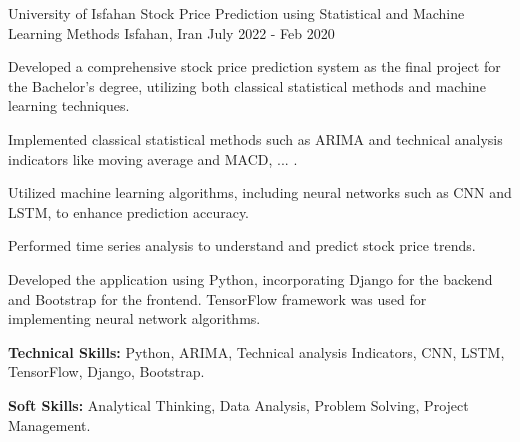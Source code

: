 

\begin{cventries}
	
	\cventry
	{University of Isfahan} %
	{Stock Price Prediction using Statistical and Machine Learning Methods } %
	{Isfahan, Iran} %
	{July 2022 - Feb 2020} %
	{
		\begin{cvitems} %
			\item {Developed a comprehensive stock price prediction system as the final project for the Bachelor's degree, utilizing both classical statistical methods and machine learning techniques.}
			\item {Implemented classical statistical methods such as ARIMA and technical analysis indicators like moving average and MACD, ... .}
			\item {Utilized machine learning algorithms, including neural networks such as CNN and LSTM, to enhance prediction accuracy.}
			\item {Performed time series analysis to understand and predict stock price trends.}
			\item {Developed the application using Python, incorporating Django for the backend and Bootstrap for the frontend. TensorFlow framework was used for implementing neural network algorithms.}
			\item {\textbf{Technical Skills:} Python, ARIMA, Technical analysis Indicators, CNN, LSTM, TensorFlow, Django, Bootstrap.}
			\item {\textbf{Soft Skills:} Analytical Thinking, Data Analysis, Problem Solving, Project Management.}
		\end{cvitems}		
	}
	

\end{cventries}
